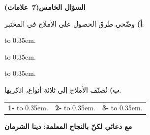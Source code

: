 \documentclass[12pt, a4paper]{article}
\newcommand{\question}[2]{%
  \par\vspace{0.2cm}\noindent
  \colorbox{gray!15}{\parbox{\dimexpr\linewidth-2\fboxsep\relax}{\textbf{\large #1}\hfill\mbox{\textbf{(#2)}}}}%
  \par\vspace{0.12cm}}
\newcommand{\fillline}{\leavevmode\xleaders\hbox to 0.35em{\hss.\hss}\hfill\kern0pt}
\newcommand{\dotline}{\par\vspace{0.2cm}\noindent\fillline\par}
\begin{document}
\question{السؤال الخامس}{7 علامات}

\textbf{أ)} وضّحي طرق الحصول على الأملاح في المختبر.
\dotline \dotline \dotline
\vspace{0.3cm}

\textbf{ب)} تُصنّف الأملاح إلى ثلاثة أنواع، اذكريها.
\par\vspace{0.3cm}
\noindent\begin{tabularx}{\linewidth}{@{}XXX@{}}
\textbf{1-} \fillline & \textbf{2-} \fillline & \textbf{3-} \fillline
\end{tabularx}

\vfill
\noindent\textbf{\large مع دعائي لكنّ بالنجاح} \hfill \textbf{\large المعلمة: دينا الشرمان}
\end{document}
